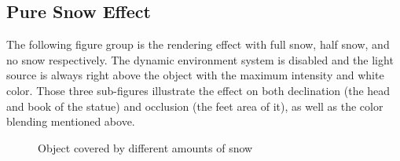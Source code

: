 \documentclass{article}
\begin{document}
\subsection {Pure Snow Effect}
The following figure group is the rendering effect with full snow, half snow, and no snow respectively.
The dynamic environment system is disabled and the light source is always right above the object with
the maximum intensity and white color. Those three sub-figures illustrate the effect on both declination 
(the head and book of the statue) and occlusion (the feet area of it), as well as the color blending
mentioned above.

\begin{figure}[h]
  \centering
  \hfill
  \hfill
  \caption{Object covered by different amounts of snow}
  \label{fig:9}
\end{figure}
\end{document}
